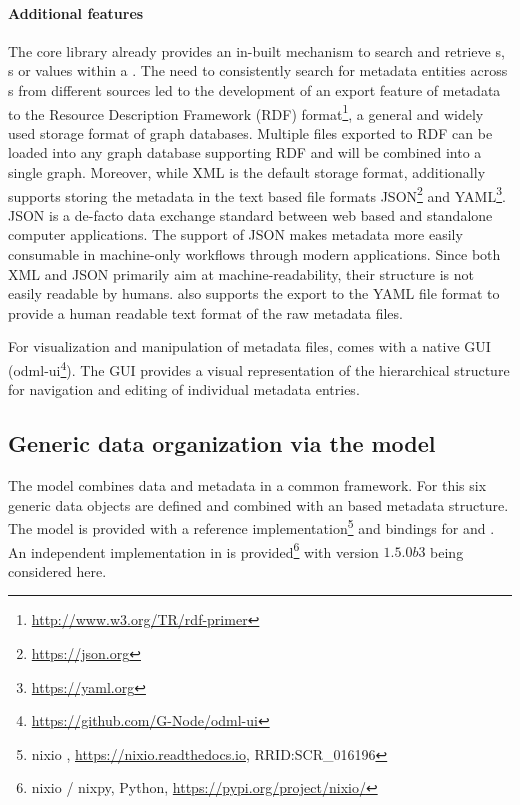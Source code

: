 \paragraph{Additional features}
The  core library already provides an in-built mechanism to search and retrieve s, s or values within a . The need to consistently search for metadata entities across s from different sources led to the development of an export feature of  metadata to the Resource Description Framework (RDF) format\footnote{\url{http://www.w3.org/TR/rdf-primer}}, a general and widely used storage format of graph databases. Multiple  files exported to RDF can be loaded into any graph database supporting RDF and will be combined into a single graph. Moreover, while XML is the default storage format,  additionally supports storing the metadata in the text based file formats JSON\footnote{\url{https://json.org}} and YAML\footnote{\url{https://yaml.org}}. JSON is a de-facto data exchange standard between web based and standalone computer applications. The support of JSON makes  metadata more easily consumable in machine-only workflows through modern applications. Since both XML and JSON primarily aim at machine-readability, their structure is not easily readable by humans.  also supports the export to the YAML file format to provide a human readable text format of the raw metadata files.

For visualization and manipulation of metadata files,  comes with a native  GUI (odml-ui\footnote{\url{https://github.com/G-Node/odml-ui}}). The GUI provides a visual representation of the hierarchical structure for navigation and editing of individual metadata entries.


\subsection{Generic data organization via the  model}
The  model combines data and metadata in a common framework. For this six generic data objects are defined and combined with an  based metadata structure. The  model is provided with a  reference implementation\footnote{nixio , \url{https://nixio.readthedocs.io},  RRID:SCR\_016196} and bindings for  and . An independent implementation in  is provided\footnote{nixio / nixpy, Python, \url{https://pypi.org/project/nixio/}} with version $1.5.0b3$ being considered here.

